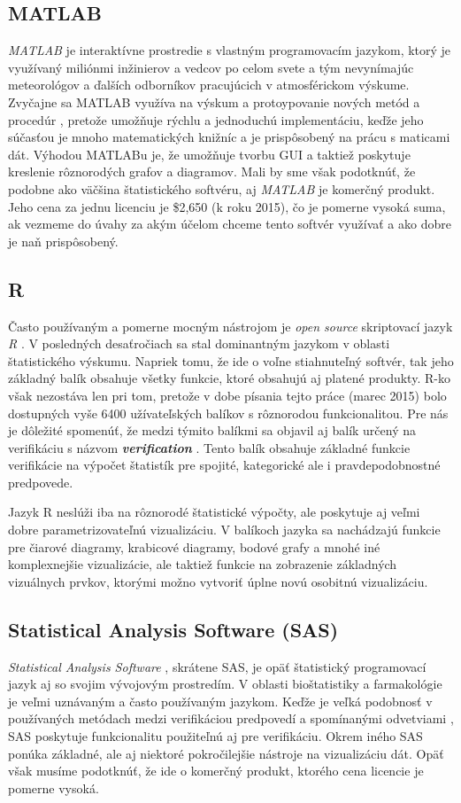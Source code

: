 \subsection{MATLAB}
\textit{MATLAB} je interaktívne prostredie s vlastným programovacím jazykom, ktorý je využívaný miliónmi inžinierov a vedcov po celom svete \cite{Matlab} a tým nevynímajúc meteorológov a ďalších odborníkov pracujúcich v atmosférickom výskume. 
Zvyčajne sa MATLAB využíva na výskum a protoypovanie nových metód a procedúr \cite{VerifSoft}, pretože umožňuje rýchlu a jednoduchú implementáciu, keďže jeho súčasťou je mnoho matematických knižníc a je prispôsobený na prácu s maticami dát.
Výhodou MATLABu je, že umožňuje tvorbu GUI a taktiež poskytuje kreslenie rôznorodých grafov a diagramov.
Mali by sme však podotknúť, že podobne ako väčšina štatistického softvéru, aj \textit{MATLAB} je komerčný produkt. Jeho cena za jednu licenciu je \$2,650 (k roku 2015), čo je pomerne vysoká suma, ak vezmeme do úvahy za akým účelom chceme tento softvér využívať a ako dobre je naň prispôsobený.

\subsection{R}
\label{subsec:R}
Často používaným a pomerne mocným nástrojom je \textit{open source} skriptovací jazyk \textit{R} \cite{RProject}. V posledných desaťročiach sa stal dominantným jazykom v oblasti štatistického výskumu. Napriek tomu, že ide o voľne stiahnuteľný softvér, tak jeho základný balík obsahuje všetky funkcie, ktoré obsahujú aj platené produkty. R-ko však nezostáva len pri tom, pretože v dobe písania tejto práce (marec 2015) bolo dostupných vyše 6400 užívateľských balíkov s rôznorodou funkcionalitou. Pre nás je dôležité spomenúť, že medzi týmito balíkmi sa objavil aj balík určený na verifikáciu s názvom \textit{\textbf{verification}} \cite{VerifPackage}. Tento balík obsahuje základné funkcie verifikácie na výpočet štatistík pre spojité, kategorické ale i pravdepodobnostné predpovede. 

Jazyk R neslúži iba na rôznorodé štatistické výpočty, ale poskytuje aj veľmi dobre parametrizovateľnú vizualizáciu. V balíkoch jazyka sa nachádzajú funkcie pre čiarové diagramy, krabicové diagramy, bodové grafy a mnohé iné komplexnejšie vizualizácie, ale taktiež funkcie na zobrazenie základných vizuálnych prvkov, ktorými možno vytvoriť úplne novú osobitnú vizualizáciu.

\subsection[SAS]{Statistical Analysis Software (SAS)}
\textit{Statistical Analysis Software} \cite{SAS}, skrátene SAS, je opäť štatistický programovací jazyk aj so svojim vývojovým prostredím. V oblasti bioštatistiky a farmakológie je veľmi uznávaným a často používaným jazykom. Keďže je veľká podobnosť v používaných metódach medzi verifikáciou predpovedí a spomínanými odvetviami \cite{VerifSoft}, SAS poskytuje funkcionalitu použiteľnú aj pre verifikáciu. Okrem iného SAS ponúka základné, ale aj niektoré pokročilejšie nástroje na vizualizáciu dát. Opäť však musíme podotknúť, že ide o komerčný produkt, ktorého cena licencie je pomerne vysoká.

